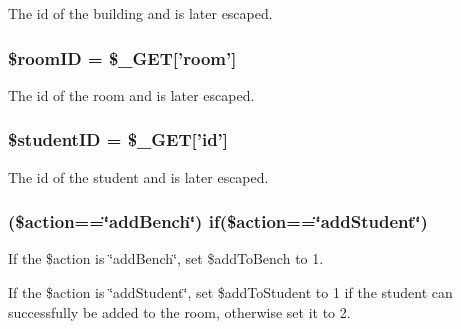 \-The id of the building and is later escaped. \hypertarget{checkRooms2_8php_a61034568ba6e795a925d00afa98d3797}{
\subsubsection[{\$room\-I\-D}]{\setlength{\rightskip}{0pt plus 5cm}\$room\-I\-D = \$\-\_\-\-G\-E\-T\mbox{[}'room'\mbox{]}}}\label{checkRooms2_8php_a61034568ba6e795a925d00afa98d3797}
\-The id of the room and is later escaped. \hypertarget{checkRooms2_8php_af62eac6f1a6ea66c9f90093940147945}{
\subsubsection[{\$student\-I\-D}]{\setlength{\rightskip}{0pt plus 5cm}\$student\-I\-D = \$\-\_\-\-G\-E\-T\mbox{[}'id'\mbox{]}}}\label{checkRooms2_8php_af62eac6f1a6ea66c9f90093940147945}
\-The id of the student and is later escaped. \hypertarget{checkRooms2_8php_a8e6545ce0238da2ec377455ff693414e}{
\subsubsection[{if}]{ (\$action==\char`\"{}add\-Bench\char`\"{}) if(\$action==\char`\"{}add\-Student\char`\"{})}}\label{checkRooms2_8php_a8e6545ce0238da2ec377455ff693414e}
\-If the \$action is \char`\"{}add\-Bench\char`\"{}, set \$add\-To\-Bench to 1.

\-If the \$action is \char`\"{}add\-Student\char`\"{}, set \$add\-To\-Student to 1 if the student can successfully be added to the room, otherwise set it to 2. 
